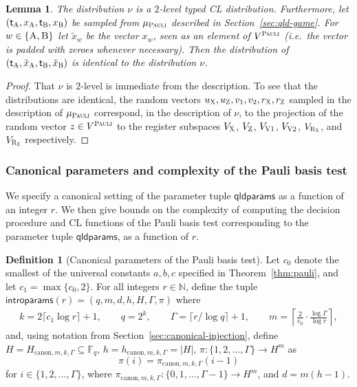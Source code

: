 \documentclass[11pt]{article}
\newtheorem{lemma}[theorem]{Lemma}
\theoremstyle{definition}
\newtheorem{definition}[theorem]{Definition}
\newcommand{\N}{\ensuremath{\mathbb{N}}}
\newcommand{\F}{\ensuremath{\mathbb{F}}}
\newcommand{\gamestyle}[1]{\ensuremath{\textsc{#1}}\xspace}
\newcommand{\pauli}{\gamestyle{Pauli}}
\newcommand{\labelstyle}[1]{\ensuremath{\textsc{#1}}\xspace}
\newcommand{\xpt}{\labelstyle{X}}
\newcommand{\zpt}{\labelstyle{Z}}
\newcommand{\rxpt}{\labelstyle{R}_\xpt}
\newcommand{\rzpt}{\labelstyle{R}_\zpt}
\newcommand{\dir}[1]{\labelstyle{V#1}}
\newcommand{\tvarstyle}[1]{\mathsf{#1}}
\newcommand{\tvar}{\ensuremath{\tvarstyle{t}}}
\newcommand{\alice}{\labelstyle{A}}
\newcommand{\bob}{\labelstyle{B}}
\newcommand{\qldparams}{\mathsf{qldparams}}
\newcommand{\introparams}{\mathsf{introparams}}
\newcommand{\canH}[3]{H_{\mathrm{canon}, #1, #2, #3}}
\newcommand{\canlilh}[3]{h_{\mathrm{canon}, #1, #2, #3}}
\newcommand{\canin}[3]{\pi_{\mathrm{canon},#1,#2,#3}}
\begin{document}
\begin{lemma}\label{lem:pauli-basis-sampler}
 The distribution $\nu$ is a
  $2$-level typed CL distribution.
  Furthermore, let $(\tvar_\alice,x_\alice,\tvar_\bob,x_\bob)$ be sampled from
  $\mu_\pauli$ described in Section~\ref{sec:qld-game}.
  For $w\in\{\alice,\bob\}$ let $\tilde{x}_w$ be the vector $x_w$, seen as an
  element of $V^\pauli$ (i.e.\ the vector is padded with zeroes whenever
  necessary).
  Then the distribution of
  $(\tvar_\alice,\tilde{x}_\alice,\tvar_\bob,\tilde{x}_\bob)$ is identical to
  the distribution $\nu$.
\end{lemma}

\begin{proof}
  That $\nu$ is $2$-level is immediate from the description.
  To see that the distributions are identical, the random vectors
  $u_\xpt,u_\zpt,v_1,v_2,r_\xpt,r_\zpt$ sampled in the description of
  $\mu_\pauli$ correspond, in the description of $\nu$, to the projection of the
  random vector $z \in V^\pauli$ to the register subspaces $V_\xpt$, $V_\zpt$,
  $V_{\dir{1}}$, $V_{\dir{2}}$, $V_{\rxpt}$, and $V_{\rzpt}$ respectively.
\end{proof}
	
\subsubsection{Canonical parameters and complexity of the Pauli basis test}
\label{sec:qld-complexity}

We specify a canonical setting of the parameter tuple $\qldparams$ as a function
of an integer $r$.
We then give bounds on the complexity of computing the decision procedure and CL
functions of the Pauli basis test corresponding to the parameter tuple
$\qldparams$, as a function of $r$.

\begin{definition}[Canonical parameters of the Pauli basis test]
  \label{def:introparams}
  Let $c_0$ denote the smallest of the universal constants $a,b,c$ specified in
  Theorem~\ref{thm:pauli}, and let $c_1 = \max\{c_0,2\}$.
  For all integers $r \in \N$, define the tuple $\introparams(r) =
  (q,m,d,h,H,\Gamma,\pi)$ where 
  \begin{gather*}
    k =  2 \lceil c_1  \log r  \rceil + 1, \qquad q=2^{k}, \qquad
    \Gamma = \lceil r/\log q \rceil + 1, \qquad
    m = \left \lceil \frac{2}{c_0} \cdot
      \frac{\log \Gamma}{\log r} \right \rceil,
  \end{gather*}
  and, using notation from Section~\ref{sec:canonical-injection}, define $H =
  \canH{m}{k}{\Gamma} \subseteq \F_q$, $h = \canlilh{m}{k}{\Gamma} = |H|$, $\pi:\{1, 2,\ldots, \Gamma\} \rightarrow H^m$
  as
  \begin{equation*}
  \pi(i) = \canin{m}{k}{\Gamma}(i-1)
  \end{equation*}
  for $i \in \{1, 2, \ldots, \Gamma\}$,
  where $\canin{m}{k}{\Gamma}:\{0, 1, \ldots, \Gamma-1\} \rightarrow H^m$, and $d =
  m(h-1)$.
\end{definition}
\end{document}
